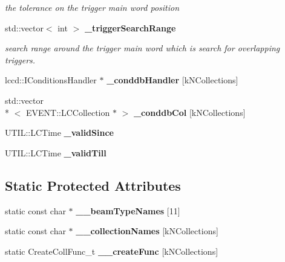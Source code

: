 \begin{DoxyCompactItemize}
\begin{DoxyCompactList}\small\item\em the tolerance on the trigger main word position \end{DoxyCompactList}\item 
std\-::vector$<$ int $>$ {\bf \-\_\-trigger\-Search\-Range}
\begin{DoxyCompactList}\small\item\em search range around the trigger main word which is search for overlapping triggers. \end{DoxyCompactList}\item 
lccd\-::\-I\-Conditions\-Handler $\ast$ {\bfseries \-\_\-conddb\-Handler} [k\-N\-Collections]\label{classmarlin_1_1CaliceConditionsDataCreator_ac99c9b4383bf7e786b763f5789147b1c}

\item 
std\-::vector\\*
$<$ E\-V\-E\-N\-T\-::\-L\-C\-Collection $\ast$ $>$ {\bfseries \-\_\-conddb\-Col} [k\-N\-Collections]\label{classmarlin_1_1CaliceConditionsDataCreator_a115c3f1d7deec6ab19666acff4be962e}

\item 
U\-T\-I\-L\-::\-L\-C\-Time {\bfseries \-\_\-valid\-Since}\label{classmarlin_1_1CaliceConditionsDataCreator_aa0271519445413603682631355db7a63}

\item 
U\-T\-I\-L\-::\-L\-C\-Time {\bfseries \-\_\-valid\-Till}\label{classmarlin_1_1CaliceConditionsDataCreator_a39ed98e58fe973f45aedbbf64a3aef2e}

\end{DoxyCompactItemize}
\subsection*{Static Protected Attributes}
\begin{DoxyCompactItemize}
\item 
static const char $\ast$ {\bfseries \-\_\-\-\_\-beam\-Type\-Names} [11]\label{classmarlin_1_1CaliceConditionsDataCreator_a86e1060f18685fd8e77e84a396b9004f}

\item 
static const char $\ast$ {\bfseries \-\_\-\-\_\-collection\-Names} [k\-N\-Collections]\label{classmarlin_1_1CaliceConditionsDataCreator_a828d149c7eaaa7c07aa28ccd2bcffd69}

\item 
static Create\-Coll\-Func\-\_\-t {\bfseries \-\_\-\-\_\-create\-Func} [k\-N\-Collections]\label{classmarlin_1_1CaliceConditionsDataCreator_a50bb1fc9365a24fde378c286a30cd47b}

\end{DoxyCompactItemize}
